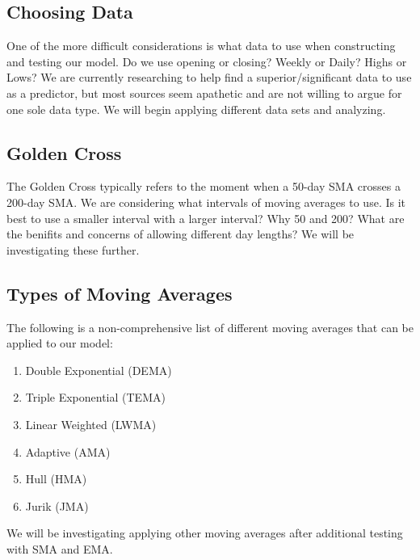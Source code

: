 \documentclass[11pt]{article}
\begin{document}
\subsection*{Choosing Data}
One of the more difficult considerations is what data to use when constructing and testing our model. Do we use opening or closing? Weekly or Daily? Highs or Lows? We are currently researching to help find a superior/significant data to use as a predictor, but most sources seem apathetic and are not willing to argue for one sole data type. We will begin applying different data sets and analyzing.

\subsection*{Golden Cross}
The Golden Cross typically refers to the moment when a 50-day SMA crosses a 200-day SMA. We are considering what intervals of moving averages to use. Is it best to use a smaller interval with a larger interval? Why 50 and 200? What are the benifits and concerns of allowing different day lengths? We will be investigating these further.

\subsection*{Types of Moving Averages}
The following is a non-comprehensive list of different moving averages that can be applied to our model:
\begin{enumerate}
	\item Double Exponential (DEMA)
	\item Triple Exponential (TEMA)
	\item Linear Weighted (LWMA)
	\item Adaptive (AMA)
	\item Hull (HMA)
	\item Jurik (JMA)
\end{enumerate}
We will be investigating applying other moving averages after additional testing with SMA and EMA.




\end{document}
